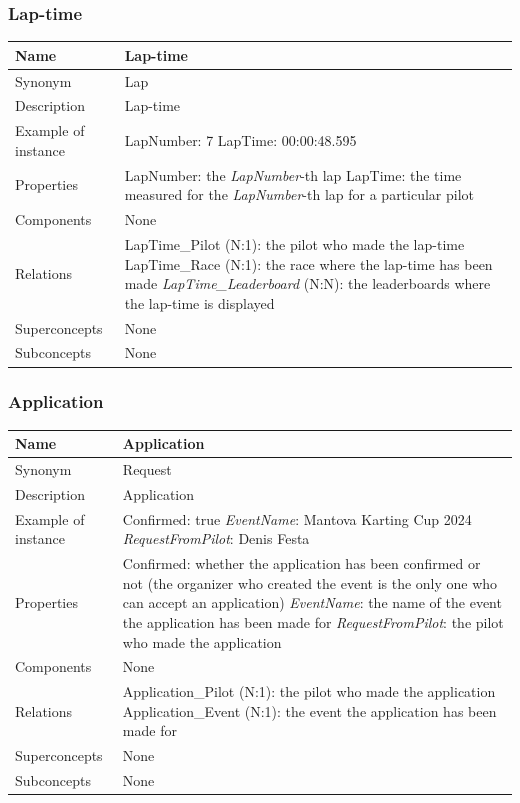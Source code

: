 \documentclass{beamer}
\begin{document}
\begin{frame}
\frametitle{Lap-time}
\begin{table}
\tiny
\begin{tabular}{|p{2cm}|p{6cm}|}
\hline
Name & \textbf{Lap-time} \\
\hline
Synonym & Lap \\
\hline
Description & Lap-time \\
\hline
Example of instance &
LapNumber: 7 \newline
LapTime: 00:00:48.595 \\
\hline
Properties &
LapNumber: the \textit{LapNumber}-th lap \newline
LapTime: the time measured for the \textit{LapNumber}-th lap for 
a particular pilot \\
\hline
Components & None \\
\hline
Relations & 
LapTime\_Pilot (N:1): the pilot who made the lap-time \newline
LapTime\_Race (N:1): the race where the lap-time has been made \newline
\textit{LapTime\_Leaderboard} (N:N): the leaderboards where the lap-time is displayed \\
\hline
Superconcepts & None \\
\hline
Subconcepts & None \\
\hline
\end{tabular}
\end{table}
\end{frame}

\begin{frame}
\frametitle{Application}
\begin{table}
\tiny
\begin{tabular}{|p{2cm}|p{6cm}|}
\hline
Name & \textbf{Application} \\
\hline
Synonym & Request \\
\hline
Description & Application \\
\hline
Example of instance &
Confirmed: true \newline
\textit{EventName}: Mantova Karting Cup 2024 \newline
\textit{RequestFromPilot}: Denis Festa \\
\hline
Properties &
Confirmed: whether the application has been confirmed or not (the organizer who
created the event is the
only one who can accept an application) \newline
\textit{EventName}: the name of the event the application has been made for \newline
\textit{RequestFromPilot}: the pilot who made the application \\
\hline
Components & None \\
\hline
Relations &
Application\_Pilot (N:1): the pilot who made the application \newline
Application\_Event (N:1): the event the application has been made for \\
\hline
Superconcepts & None \\
\hline
Subconcepts & None \\
\hline
\end{tabular}
\end{table}
\end{frame}
\end{document}
